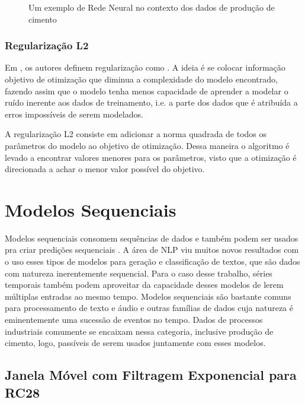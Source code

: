 \begin{figure}
  \centering
  
  \caption{Um exemplo de Rede Neural no contexto dos dados de produção de cimento}
  \label{fig:nn}
\end{figure}


\bigskip

\subsubsection{Regularização L2}

Em \cite{dlbook}, os autores definem regularização como . A ideia é se colocar informação objetivo de 
otimização que diminua a complexidade do modelo encontrado, fazendo assim
que o modelo tenha menos capacidade de aprender a modelar o ruído inerente
aos dados de treinamento, i.e. a parte dos dados que é atribuída a erros
impossíveis de serem modelados.

A regularização L2 consiste em adicionar a norma quadrada de todos os parâmetros
do modelo ao objetivo de otimização. Dessa maneira o algoritmo é levado a
encontrar valores menores para os parâmetros, visto que a otimização é
direcionada a achar o menor valor possível do objetivo.



\section{Modelos Sequenciais}

Modelos sequenciais consomem sequências de dados e também podem ser usados pra
criar predições sequenciais \citep{dlbook}. A área de NLP viu muitos novos
resultados com o uso esses tipos de modelos para geração e classificação de textos, que são dados com
natureza inerentemente sequencial. Para o caso desse trabalho, séries temporais também podem
aproveitar da capacidade desses modelos de lerem múltiplas entradas ao mesmo
tempo. Modelos sequenciais são bastante comuns para processamento de texto e
áudio e outras famílias de dados cuja natureza é eminentemente uma sucessão de
eventos no tempo. Dados de processos industriais comumente se encaixam nessa
categoria, inclusive produção de cimento, logo, passíveis de serem usados
juntamente com esses modelos.



\subsection{Janela Móvel com Filtragem Exponencial para RC28 }
\label{ses:ewma}

